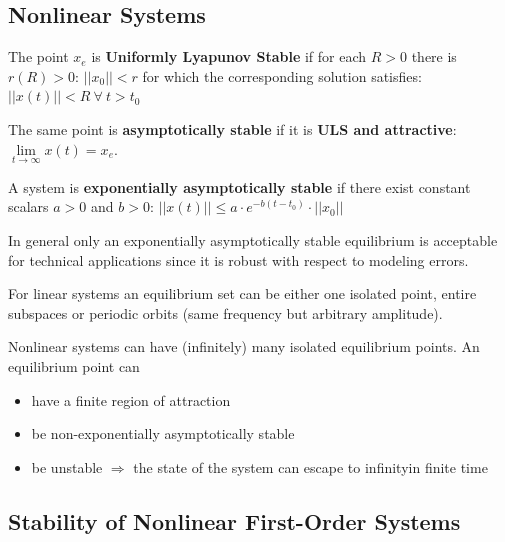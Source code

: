 \documentclass[10pt,a4paper]{scrartcl}
\begin{document}
\begin{multicols*}{3}
\section{Nonlinear Systems}



\finn

The point $x_e$ is \textbf{Uniformly Lyapunov Stable} if for each $R>0$ there is $r(R)>0$: $||x_0||<r$ for which the corresponding solution satisfies: $||x(t)||<R\ \forall\ t>t_0$

\finn

The same point is \textbf{asymptotically stable} if it is \textbf{ULS and attractive}: $\lim\limits_{t\rightarrow\infty} x(t) = x_e$.

\finn

A system is \textbf{exponentially asymptotically stable} if there exist constant scalars $a>0$ and $b>0$: $||x(t)||\leq a\cdot e^{-b(t-t_0)}\cdot||x_0||$

In general only an exponentially asymptotically stable equilibrium is acceptable for technical applications since it is robust with respect to modeling errors.

\finn

For linear systems an equilibrium set can be either one isolated point, entire subspaces or periodic orbits (same frequency but arbitrary amplitude).

Nonlinear systems can have (infinitely) many isolated equilibrium points. An equilibrium point can

\begin{itemize}
\ncompaq
\item have a finite region of attraction
\item be non-exponentially asymptotically stable
\item be unstable $\Rightarrow$ the state of the system can \glqq escape to infinity\grqq in finite time
\end{itemize}

\subsection{Stability of Nonlinear First-Order Systems}



\end{multicols*}
\end{document}
